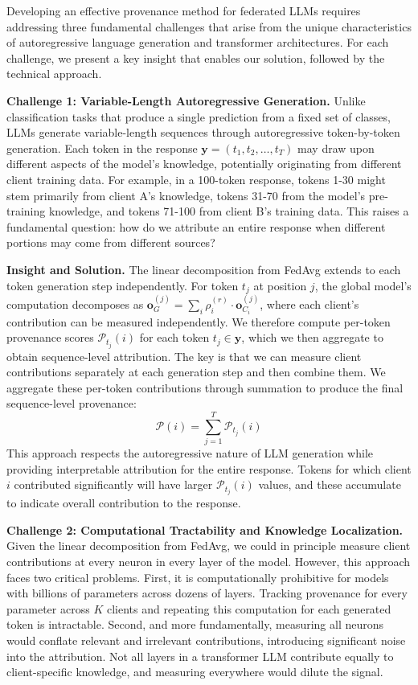 Developing an effective provenance method for federated LLMs requires addressing three fundamental challenges that arise from the unique characteristics of autoregressive language generation and transformer architectures. For each challenge, we present a key insight that enables our solution, followed by the technical approach.

\textbf{Challenge 1: Variable-Length Autoregressive Generation.} Unlike classification tasks that produce a single prediction from a fixed set of classes, LLMs generate variable-length sequences through autoregressive token-by-token generation. Each token in the response $\mathbf{y} = (t_1, t_2, \ldots, t_T)$ may draw upon different aspects of the model's knowledge, potentially originating from different client training data. For example, in a 100-token response, tokens 1-30 might stem primarily from client A's knowledge, tokens 31-70 from the model's pre-training knowledge, and tokens 71-100 from client B's training data. This raises a fundamental question: how do we attribute an entire response when different portions may come from different sources?

\textbf{Insight and Solution.} The linear decomposition from FedAvg extends to each token generation step independently. For token $t_j$ at position $j$, the global model's computation decomposes as $\mathbf{o}_G^{(j)} = \sum_i \rho_i^{(r)} \cdot \mathbf{o}_{C_i}^{(j)}$, where each client's contribution can be measured independently. We therefore compute per-token provenance scores $\mathcal{P}_{t_j}(i)$ for each token $t_j \in \mathbf{y}$, which we then aggregate to obtain sequence-level attribution. The key is that we can measure client contributions separately at each generation step and then combine them. We aggregate these per-token contributions through summation to produce the final sequence-level provenance:
\begin{equation}
\label{eq:sequence-provenance}
\mathcal{P}(i) = \sum_{j=1}^T \mathcal{P}_{t_j}(i)
\end{equation}
This approach respects the autoregressive nature of LLM generation while providing interpretable attribution for the entire response. Tokens for which client $i$ contributed significantly will have larger $\mathcal{P}_{t_j}(i)$ values, and these accumulate to indicate overall contribution to the response.

\textbf{Challenge 2: Computational Tractability and Knowledge Localization.} Given the linear decomposition from FedAvg, we could in principle measure client contributions at every neuron in every layer of the model. However, this approach faces two critical problems. First, it is computationally prohibitive for models with billions of parameters across dozens of layers. Tracking provenance for every parameter across $K$ clients and repeating this computation for each generated token is intractable. Second, and more fundamentally, measuring all neurons would conflate relevant and irrelevant contributions, introducing significant noise into the attribution. Not all layers in a transformer LLM contribute equally to client-specific knowledge, and measuring everywhere would dilute the signal.

